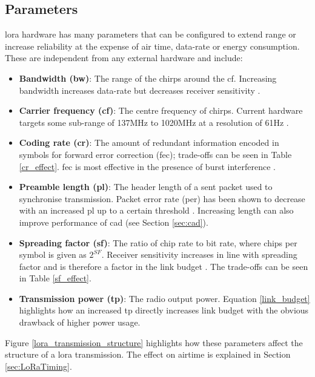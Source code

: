 \subsection{Parameters}
\ac{lora} hardware has many parameters that can be configured to extend range or increase reliability at the expense of air time, data-rate or energy consumption. These are independent from any external hardware and include:
\begin{itemize}
    \item \textbf{Bandwidth (\ac{bw})}: The range of the chirps around the \ac{cf}. Increasing bandwidth increases data-rate but decreases receiver sensitivity \cite{3YP:STUDY_OF_LORA}.
    \item \textbf{Carrier frequency (\ac{cf})}: The centre frequency of chirps. Current hardware targets some sub-range of 137MHz to 1020MHz at a resolution of 61Hz \cite{3YP:LORA_SX12}. 
    \item \textbf{Coding rate (\ac{cr})}: The amount of redundant information encoded in symbols for forward error correction (\ac{fec}); trade-offs can be seen in Table \ref{cr_effect}. \ac{fec} is most effective in the presence of burst interference \cite{3YP:LORA_MOD_BASICS}.
    \item \textbf{Preamble length (\ac{pl})}: The header length of a sent packet used to synchronise transmission. Packet error rate (\ac{per}) has been shown to decrease with an increased \ac{pl} up to a certain threshold \cite{3YP:LORA_PERFORMANCE}. Increasing length can also improve performance of \ac{cad} (see Section \ref{sec:cad}).
    \item \textbf{Spreading factor (\ac{sf})}: The ratio of chip rate to bit rate, where chips per symbol is given as $2^{SF}$. Receiver sensitivity increases in line with spreading factor and is therefore a factor in the link budget \cite{3YP:LORA_SX12}. The trade-offs can be seen in Table \ref{sf_effect}.
    \item \textbf{Transmission power (\ac{tp})}: The radio output power. Equation \ref{link_budget} highlights how an increased \ac{tp} directly increases link budget with the obvious drawback of higher power usage.
\end{itemize}
Figure \ref{lora_transmission_structure} highlights how these parameters affect the structure of a \ac{lora} transmission. The effect on airtime is explained in Section \ref{sec:LoRaTiming}.


